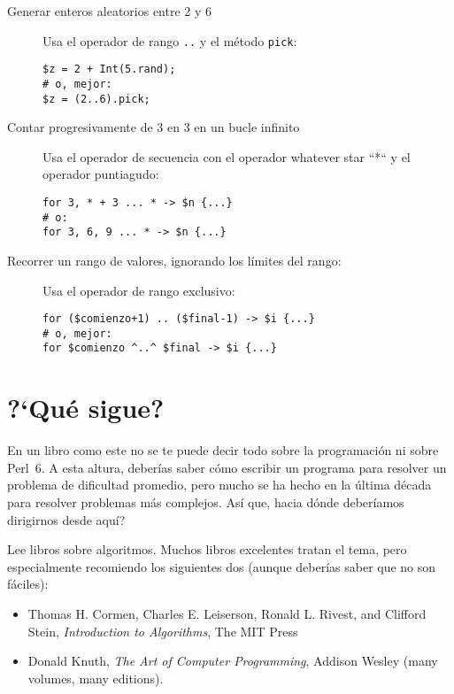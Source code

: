 \begin{description}
\item[Generar enteros aleatorios entre 2 y 6] Usa el operador
de rango \verb|..| y el método {\tt pick}:
\begin{verbatim}
$z = 2 + Int(5.rand);
# o, mejor:
$z = (2..6).pick;
\end{verbatim}

\item[Contar progresivamente de 3 en 3 en un bucle infinito] Usa 
el operador de secuencia con el operador whatever star ``*``
y el operador puntiagudo:

\begin{verbatim}
for 3, * + 3 ... * -> $n {...}
# o:
for 3, 6, 9 ... * -> $n {...}    
\end{verbatim}

\item[Recorrer un rango de valores, ignorando los límites del rango:] Usa
el operador de rango exclusivo:

\begin{verbatim}
for ($comienzo+1) .. ($final-1) -> $i {...}
# o, mejor:
for $comienzo ^..^ $final -> $i {...}
\end{verbatim}
\end{description}

\section{?`Qué sigue?}

En un libro como este no se te puede decir todo sobre la
programación ni sobre Perl~6. A esta altura, deberías saber cómo
escribir un programa para resolver un problema de dificultad promedio,
pero mucho se ha hecho en la última década para resolver problemas
más complejos. Así que, hacia dónde deberíamos dirigirnos desde aquí?

Lee libros sobre algoritmos. Muchos libros excelentes tratan el tema,
pero especialmente recomiendo los siguientes dos (aunque deberías saber que no
son fáciles):
\begin{itemize}
\item Thomas H. Cormen, Charles E. Leiserson, Ronald L. Rivest, 
and Clifford Stein, \emph{Introduction to 
Algorithms}, The MIT Press
\item Donald Knuth, \emph{The Art of Computer Programming}, Addison Wesley 
(many volumes, many editions).
\end{itemize}

